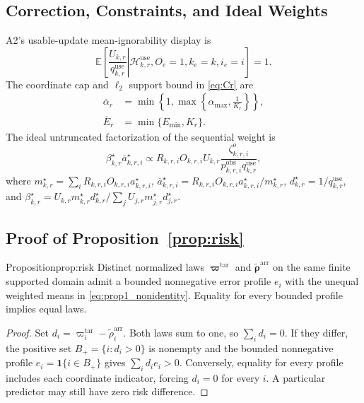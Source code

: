 \subsection{Correction, Constraints, and Ideal Weights}
A2's usable-update mean-ignorability display is
\begin{equation}
 \mathbb{E}\!\left[
 \left.
 \frac{U_{k,r}}{q^{\mathrm{use}}_{k,r}}
 \right|
 \mathcal{H}^{\mathrm{use}}_{k,r},
 O_e=1,k_e=k,i_e=i
 \right]
 =1.
 \label{eq:A2_use_mean_ignorability}
\end{equation}
The coordinate cap and $\ell_2$ support bound in \eqref{eq:Cr} are
\begin{equation}
\begin{aligned}
 \overline\alpha_r
 &=
 \min\!\left\{
 1,
 \max\!\left\{
 \alpha_{\max},
 \frac{1}{K_r}
 \right\}
 \right\},\\
 \overline E_r
 &=
 \min\{E_{\min},K_r\}.
\end{aligned}
 \label{eq:cap_ess}
\end{equation}
The ideal untruncated factorization of the sequential weight is
\begin{equation}
 \beta^\star_{k,r}\overline a^\star_{k,r,i}
 \propto
 R_{k,r,i}O_{k,r,i}U_{k,r}
 \frac{\zeta^{o}_{k,r,i}}
 {p^{\mathrm{obs}}_{k,r,i}q^{\mathrm{use}}_{k,r}},
 \label{eq:factorized_global_weight}
\end{equation}
where
$m^\star_{k,r}=\sum_i R_{k,r,i}O_{k,r,i}a^\star_{k,r,i}$,
$\overline a^\star_{k,r,i}=R_{k,r,i}O_{k,r,i}a^\star_{k,r,i}/m^\star_{k,r}$,
$d^\star_{k,r}=1/q^{\mathrm{use}}_{k,r}$, and
$\beta^\star_{k,r}=U_{k,r}m^\star_{k,r}d^\star_{k,r}/
\sum_j U_{j,r}m^\star_{j,r}d^\star_{j,r}$.

\subsection{Proof of Proposition~\ref{prop:risk}}
\begin{restated}{Proposition}{prop:risk}
Distinct normalized laws $\boldsymbol\varpi^{\mathrm{tar}}$ and
$\widetilde{\boldsymbol\rho}^{\mathrm{arr}}$ on the same finite supported
domain admit a bounded nonnegative error profile $e_i$ with
the unequal weighted means in \eqref{eq:prop1_nonidentity}.
Equality for every bounded profile implies equal laws.
\end{restated}
\begin{proof}

Set $d_i=\varpi_i^{\mathrm{tar}}-\widetilde\rho_i^{\mathrm{arr}}$.
Both laws sum to one, so $\sum_i d_i=0$.  If they differ, the positive set
$B_+=\{i:d_i>0\}$ is nonempty and the bounded nonnegative profile
$e_i=\mathbf1\{i\in B_+\}$ gives $\sum_i d_i e_i>0$.
Conversely, equality for every profile includes each coordinate indicator,
forcing $d_i=0$ for every $i$.  A particular predictor may still have zero
risk difference.
\end{proof}

